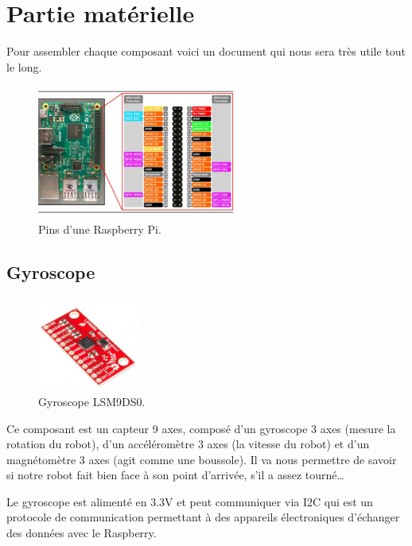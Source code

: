 \documentclass[a4paper,12pt]{report}  %
\begin{document}
\pagebreak


\section{Partie matérielle}
Pour assembler chaque composant voici un document qui nous sera très utile tout le long. 

\begin{figure}[H]
	\centering
	\includegraphics[width=0.6\textwidth]{./attachments/raspberry_pi_pin_map.jpg}
	\caption{Pins d'une Raspberry Pi. }
\end{figure}

\subsection{Gyroscope}

\begin{figure}[H]
	\centering
	\includegraphics[width=0.3\textwidth]{./attachments/gyroscope.jpg}
	\caption{Gyroscope LSM9DS0.}
	
\end{figure}

Ce composant est un capteur 9 axes, 
composé d’un gyroscope 3 axes (mesure la rotation du robot), 
d’un accéléromètre 3 axes (la vitesse du robot) 
et d’un magnétomètre 3 axes (agit comme une boussole). 
Il va nous permettre de savoir si notre robot fait 
bien face à son point d'arrivée, s’il a assez tourné… 

Le gyroscope est alimenté en 3.3V et peut communiquer via I2C qui est un protocole de communication permettant à des appareils électroniques d’échanger des données avec le Raspberry. 
\end{document}
